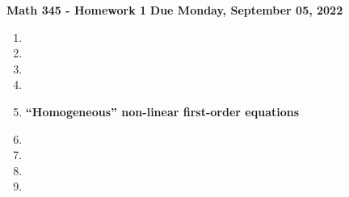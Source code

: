 \documentclass[12pt]{article}
\newcommand{\say}[1]{\textquotedblleft{#1}\textquotedblright}
\begin{document}
\pagestyle{fancy}
\fancyhf{}

\noindent \textbf{Math 345 - Homework 1} \hspace{2.7in} \textbf{Due Monday, September 05, 2022}
\raggedright
\begin{enumerate}
  \item \newpage
  \item \newpage
  \item \vspace{1cm}
  \item \vspace{1cm}
  \item \vspace{0.1in}
  
  \newpage
  \noindent \textbf{\say{Homogeneous} non-linear first-order equations} \vspace{0.1in}
  \item \vspace{1cm}\newpage
  \item \vspace{1cm}
  \item \vspace{1cm}
  \item 
\end{enumerate}
\end{document}

